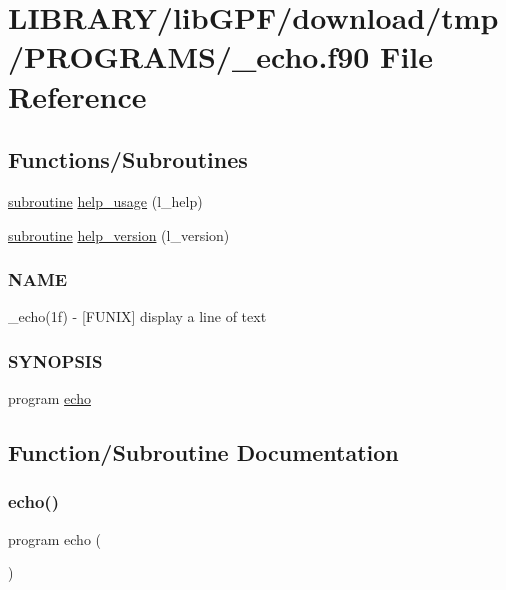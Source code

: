\hypertarget{__echo_8f90}{}\section{L\+I\+B\+R\+A\+R\+Y/lib\+G\+P\+F/download/tmp/\+P\+R\+O\+G\+R\+A\+M\+S/\+\_\+echo.f90 File Reference}
\label{__echo_8f90}
\subsection*{Functions/\+Subroutines}
\begin{DoxyCompactItemize}
\item 
\hyperlink{M__stopwatch_83_8txt_acfbcff50169d691ff02d4a123ed70482}{subroutine} \hyperlink{__echo_8f90_a3e09a3b52ee8fb04eeb93fe5761626a8}{help\+\_\+usage} (l\+\_\+help)
\item 
\hyperlink{M__stopwatch_83_8txt_acfbcff50169d691ff02d4a123ed70482}{subroutine} \hyperlink{__echo_8f90_a39c21619b08a3c22f19e2306efd7f766}{help\+\_\+version} (l\+\_\+version)
\begin{DoxyCompactList}\small\item\em \subsubsection*{N\+A\+ME}

\+\_\+echo(1f) -\/ \mbox{[}F\+U\+N\+IX\mbox{]} display a line of text \subsubsection*{S\+Y\+N\+O\+P\+S\+IS}\end{DoxyCompactList}\item 
program \hyperlink{__echo_8f90_a7b58d66872f4cd7b2249cc9d9996f08a}{echo}
\end{DoxyCompactItemize}


\subsection{Function/\+Subroutine Documentation}
\mbox{\label{__echo_8f90_a7b58d66872f4cd7b2249cc9d9996f08a}} 
\subsubsection{\texorpdfstring{echo()}{echo()}}
{\footnotesize\ttfamily program echo (\begin{DoxyParamCaption}{ }\end{DoxyParamCaption})}



